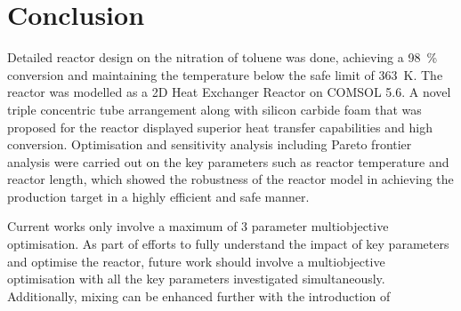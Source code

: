 \section{Conclusion} \label{sec:conclusion}
Detailed reactor design on the nitration of toluene was done, achieving a \SI{98}{\%} conversion and maintaining the temperature below the safe limit of \SI{363}{\K}. The reactor was modelled as a 2D Heat Exchanger Reactor on COMSOL 5.6. A novel triple concentric tube arrangement along with silicon carbide foam that was proposed for the reactor displayed superior heat transfer capabilities and high conversion. Optimisation and sensitivity analysis including Pareto frontier analysis were carried out on the key parameters such as reactor temperature and reactor length, which showed the robustness of the reactor model in achieving the production target in a highly efficient and safe manner. 

Current works only involve a maximum of 3 parameter multiobjective optimisation. As part of efforts to fully understand the impact of key parameters and optimise the reactor, future work should involve a multiobjective optimisation with all the key parameters investigated simultaneously. Additionally, mixing can be enhanced further with the introduction of 


